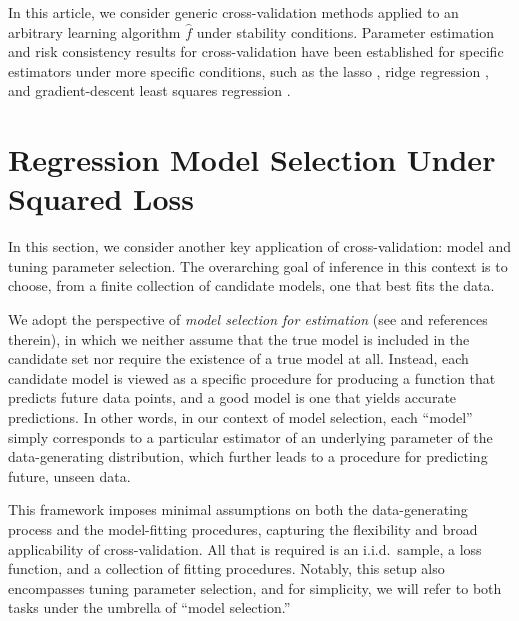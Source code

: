 \documentclass[11pt]{article}
\theoremstyle{plain}
\begin{document}
In this article, we consider generic cross-validation methods applied to an arbitrary learning algorithm $\hat f$ under stability conditions.  Parameter estimation and risk consistency results for cross-validation have been established for specific estimators under more specific conditions, such as the lasso \citep{homrighausen2017risk,chetverikov2021cross}, ridge regression \citep{patil2021uniform}, and gradient-descent least squares regression \citep{patil2024failures}.

\newpage


\section{Regression Model Selection Under Squared Loss}\label{sec:3-model-selection}
In this section, we consider another key application of cross-validation: model and tuning parameter selection. The overarching goal of inference in this context is to choose, from a finite collection of candidate models, one that best fits the data.

We adopt the perspective of \emph{model selection for estimation} (see  and references therein), in which we neither assume that the true model is included in the candidate set nor require the existence of a true model at all. Instead, each candidate model is viewed as a specific procedure for producing a function that predicts future data points, and a good model is one that yields accurate predictions.  In other words, in our context of model selection, each ``model'' simply corresponds to a particular estimator of an underlying parameter of the data-generating distribution, which further leads to a procedure for predicting future, unseen data.

This framework imposes minimal assumptions on both the data-generating process and the model-fitting procedures, capturing the flexibility and broad applicability of cross-validation. All that is required is an i.i.d.\ sample, a loss function, and a collection of fitting procedures. Notably, this setup also encompasses tuning parameter selection, and for simplicity, we will refer to both tasks under the umbrella of ``model selection.''
\end{document}
